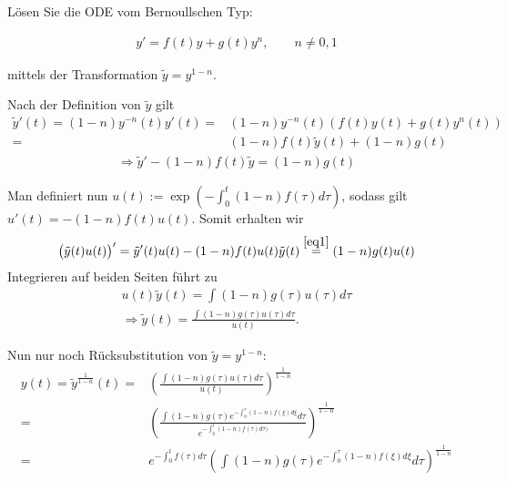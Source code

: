 \begin{exercise}
  Lösen Sie die ODE vom Bernoullschen Typ:

  \begin{align*}
    y' = f(t)y + g(t) y^n , \qquad n \neq 0,1
  \end{align*}

  mittels der Transformation $\tilde{y} = y^{1-n}$.
\end{exercise}

\begin{solution}
  Nach der Definition von $\tilde{y}$ gilt
  \begin{align*}
    \tilde{y}'(t) = (1-n)y^{-n}(t)y'(t) =& (1-n)y^{-n}(t)(f(t)y(t) + g(t)y^n(t)) \\
    =& (1-n)f(t)\tilde{y}(t) + (1-n)g(t)
  \end{align*}
  \begin{align}\label{eq1}
    \Rightarrow \tilde{y}' - (1-n)f(t)\tilde{y} = (1-n) g(t)
  \end{align}

  Man definiert nun $u(t) := \exp(-\int_0^t (1-n)f(\tau)d\tau)$, sodass gilt $u'(t) = -(1-n)f(t)u(t)$. Somit erhalten wir
  \begin{align*}
    \big(\tilde{y}(t)u(t)\big)' = \tilde{y}'(t)u(t) - (1-n)f(t)u(t) \tilde{y}(t) \stackrel{\eqref{eq1}}{=} (1-n)g(t)u(t)
  \end{align*}
  Integrieren auf beiden Seiten führt zu
  \begin{align*}
    u(t) \tilde{y}(t) = \int (1-n)g(\tau)u(\tau)d\tau \\
    \Rightarrow \tilde{y}(t) = \frac{\int (1-n)g(\tau)u(\tau)d\tau}{u(t)}.
  \end{align*}

  Nun nur noch Rücksubstitution von $\tilde{y} = y^{1-n}$:
  \begin{align*}
    y(t) = \tilde{y}^{\frac{1}{1-n}}(t) = & \left(\frac{\int (1-n)g(\tau)u(\tau)d\tau}{u(t)}\right)^{\frac{1}{1-n}} \\
    =& \left(\frac{\int (1-n)g(\tau) e^{-\int_0^\tau (1-n)f(\xi)d\xi}d\tau}{e^{-\int_0^t (1-n)f(\tau)d\tau)}}\right)^{\frac{1}{1-n}} \\
    =& e^{-\int_0^t f(\tau)d\tau}\left(\int (1-n)g(\tau) e^{-\int_0^\tau (1-n)f(\xi)d\xi}d\tau \right)^{\frac{1}{1-n}}
  \end{align*}
\end{solution}
